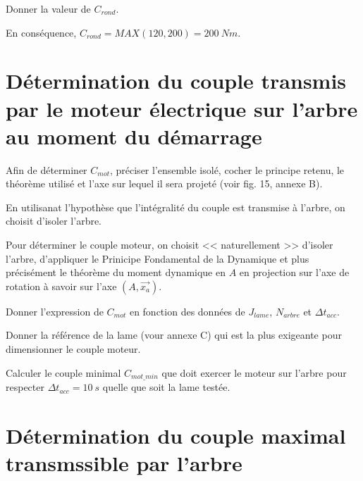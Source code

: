 \documentclass[11pt]{article}
\begin{document}
\UPSTIquestion Donner la valeur de $C_{rond}$.

\begin{UPSTIcorrige}
En conséquence, $C_{rond} = MAX(120,200) = \SI{200}{Nm}$. 
\end{UPSTIcorrige}

\section{Détermination du couple transmis par le moteur électrique sur l'arbre au moment du démarrage}

\UPSTIquestion* Afin de déterminer $C_{mot}$, préciser l'ensemble isolé, cocher le principe retenu, le théorème utilisé et l'axe sur lequel il sera projeté (voir fig. 15, annexe B). 

\begin{UPSTIcorrige}
En utilisanat l'hypothèse que l’intégralité du couple est transmise à l'arbre, on choisit d'isoler l'arbre. 

Pour déterminer le couple moteur, on choisit << naturellement >> d'isoler l'arbre, d'appliquer le Prinicipe Fondamental de la Dynamique et plus précisément le théorème du moment dynamique en $A$ en projection sur l'axe de rotation à savoir sur l'axe $\left(A,\overrightarrow{x_a}\right)$.
 \end{UPSTIcorrige}

\UPSTIquestion Donner l'expression de $C_{mot}$ en fonction des données de $J_{lame}$, $N_{arbre}$ et $\Delta t_{acc}$. 
\begin{UPSTIcorrige}
\end{UPSTIcorrige}

\UPSTIquestion Donner la référence de la lame (vour annexe C) qui est la plus exigeante pour dimensionner le couple moteur. 
\begin{UPSTIcorrige}
\end{UPSTIcorrige}


\UPSTIquestion Calculer le couple minimal $C_{mot\_min}$ que doit exercer le moteur sur l'arbre pour respecter $\Delta t _{acc}  = \SI{10}{s}$ quelle que soit la lame testée. 
\begin{UPSTIcorrige}
\end{UPSTIcorrige}


\section{Détermination du couple maximal transmssible par l'arbre}
\end{document}
